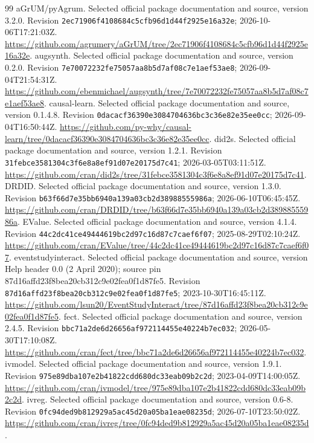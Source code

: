 \begin{thebibliography}{99}
 aGrUM/pyAgrum. Selected official package documentation and source, version 3.2.0. Revision \nolinkurl{2ec71906f4108684c5cfb96d1d44f2925e16a32e}; 2026-10-06T17:21:03Z. \url{https://github.com/agrumery/aGrUM/tree/2ec71906f4108684c5cfb96d1d44f2925e16a32e}.
 augsynth. Selected official package documentation and source, version 0.2.0. Revision \nolinkurl{7e70072232fe75057aa8b5d7af08c7e1aef53ae8}; 2026-09-04T21:54:31Z. \url{https://github.com/ebenmichael/augsynth/tree/7e70072232fe75057aa8b5d7af08c7e1aef53ae8}.
 causal-learn. Selected official package documentation and source, version 0.1.4.8. Revision \nolinkurl{0dacacf36390e3084704636bc3c36e82e35ee0cc}; 2026-09-04T16:50:44Z. \url{https://github.com/py-why/causal-learn/tree/0dacacf36390e3084704636bc3c36e82e35ee0cc}.
 did2s. Selected official package documentation and source, version 1.2.1. Revision \nolinkurl{31febce3581304c3f6e8a8ef91d07e20175d7c41}; 2026-03-05T03:11:51Z. \url{https://github.com/cran/did2s/tree/31febce3581304c3f6e8a8ef91d07e20175d7c41}.
 DRDID. Selected official package documentation and source, version 1.3.0. Revision \nolinkurl{b63f66d7e35bb6940a139a03cb2d38988555986a}; 2026-06-10T06:45:45Z. \url{https://github.com/cran/DRDID/tree/b63f66d7e35bb6940a139a03cb2d38988555986a}.
 EValue. Selected official package documentation and source, version 4.1.4. Revision \nolinkurl{44c2dc41ce49444619bc2d97c16d87c7caef6f07}; 2025-08-29T02:10:24Z. \url{https://github.com/cran/EValue/tree/44c2dc41ce49444619bc2d97c16d87c7caef6f07}.
 eventstudyinteract. Selected official package documentation and source, version Help header 0.0 (2 April 2020); source pin 87d16affd23f8bea20cb312c9e02fea0f1d87fe5. Revision \nolinkurl{87d16affd23f8bea20cb312c9e02fea0f1d87fe5}; 2023-10-30T16:45:11Z. \url{https://github.com/lsun20/EventStudyInteract/tree/87d16affd23f8bea20cb312c9e02fea0f1d87fe5}.
 fect. Selected official package documentation and source, version 2.4.5. Revision \nolinkurl{bbc71a2de6d26656af972114455e40224b7ec032}; 2026-05-30T17:10:08Z. \url{https://github.com/cran/fect/tree/bbc71a2de6d26656af972114455e40224b7ec032}.
 ivmodel. Selected official package documentation and source, version 1.9.1. Revision \nolinkurl{975e89dba107e2b41822cdd680dc33eab09b2c2d}; 2023-04-09T14:00:05Z. \url{https://github.com/cran/ivmodel/tree/975e89dba107e2b41822cdd680dc33eab09b2c2d}.
 ivreg. Selected official package documentation and source, version 0.6-8. Revision \nolinkurl{0fc94ded9b812929a5ac45d20a05ba1eae08235d}; 2026-07-10T23:50:02Z. \url{https://github.com/cran/ivreg/tree/0fc94ded9b812929a5ac45d20a05ba1eae08235d}.

\end{thebibliography}
